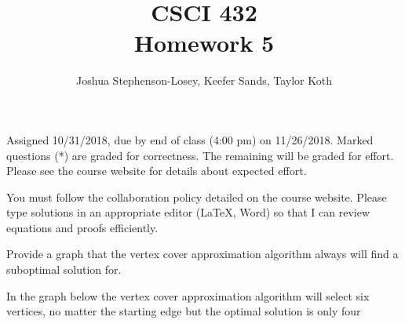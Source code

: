 \documentclass[12pt]{article}
\author{Joshua Stephenson-Losey,
Keefer Sands,
Taylor Koth}
\newenvironment{problem}[2][Problem]
{\begin{trivlist}
\item[\hskip \labelsep {\bfseries #1}\hskip \labelsep {\bfseries #2.}]}{\end{trivlist}}
\begin{document}
 
\title{CSCI 432\\Homework 5}
\date{}
\maketitle

Assigned 10/31/2018, due by end of class (4:00 pm) on 11/26/2018. Marked questions (*) are graded for correctness. The remaining will be graded for effort. Please see the course website for details about expected effort.

You must follow the collaboration policy detailed on the course website. Please type solutions in an appropriate editor (\LaTeX, Word) so that I can review equations and proofs efficiently. 

\begin{problem}{1*}
Provide a graph that the vertex cover approximation algorithm always will find a suboptimal solution for.

In the graph below the vertex cover approximation algorithm will select six vertices, no matter the starting edge but the optimal solution is only four

\end{problem}
\end{document}
